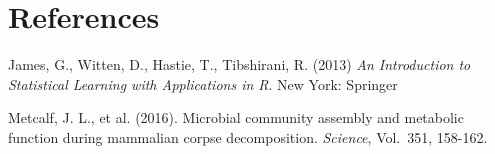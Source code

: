 \documentclass{article}
\begin{document}
\section{References}

\noindent James, G., Witten, D., Hastie, T., Tibshirani, R. (2013) \textit{An
  Introduction to Statistical Learning with Applications in R}. New
York: Springer

\noindent Metcalf, J. L., et al. (2016).  Microbial community assembly and
metabolic function during mammalian corpse decomposition.
\textit{Science}, Vol.~351, 158-162.
\end{document}
